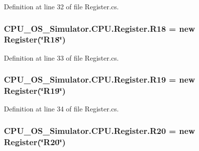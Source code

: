 Definition at line 32 of file Register.\+cs.

\hypertarget{class_c_p_u___o_s___simulator_1_1_c_p_u_1_1_register_aac05b1dce0cbfda874ca7c1783485095}{}
\subsubsection[{R18}]{ C\+P\+U\+\_\+\+O\+S\+\_\+\+Simulator.\+C\+P\+U.\+Register.\+R18 = new {\bf Register}(\char`\"{}R18\char`\"{})\hspace{0.3cm}{\ttfamily [static]}}\label{class_c_p_u___o_s___simulator_1_1_c_p_u_1_1_register_aac05b1dce0cbfda874ca7c1783485095}


Definition at line 33 of file Register.\+cs.

\hypertarget{class_c_p_u___o_s___simulator_1_1_c_p_u_1_1_register_a1d5394eb0e63d28e96decccbdbc2ec2c}{}
\subsubsection[{R19}]{ C\+P\+U\+\_\+\+O\+S\+\_\+\+Simulator.\+C\+P\+U.\+Register.\+R19 = new {\bf Register}(\char`\"{}R19\char`\"{})\hspace{0.3cm}{\ttfamily [static]}}\label{class_c_p_u___o_s___simulator_1_1_c_p_u_1_1_register_a1d5394eb0e63d28e96decccbdbc2ec2c}


Definition at line 34 of file Register.\+cs.

\hypertarget{class_c_p_u___o_s___simulator_1_1_c_p_u_1_1_register_a6fe52ef881281bbfdc42aa7f4cc68f4d}{}
\subsubsection[{R20}]{ C\+P\+U\+\_\+\+O\+S\+\_\+\+Simulator.\+C\+P\+U.\+Register.\+R20 = new {\bf Register}(\char`\"{}R20\char`\"{})\hspace{0.3cm}{\ttfamily [static]}}\label{class_c_p_u___o_s___simulator_1_1_c_p_u_1_1_register_a6fe52ef881281bbfdc42aa7f4cc68f4d}


